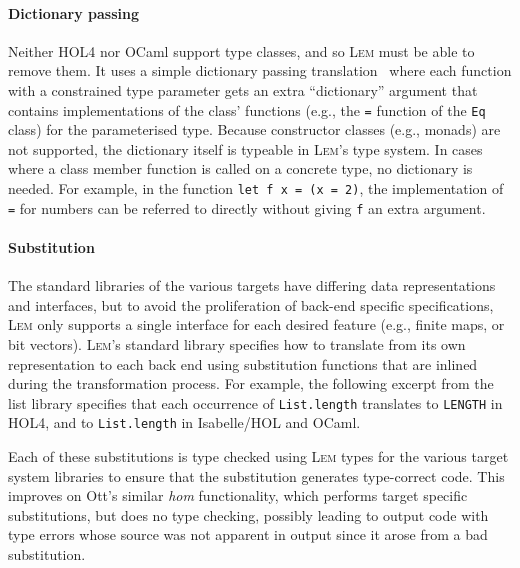 \documentclass[a4paper]{llncs}
\newcommand{\Lem}{\textsc{Lem}}
\begin{document}
\paragraph{Dictionary passing} Neither HOL4 nor OCaml support type classes, and
so \Lem{} must be able to remove them.  It uses a simple dictionary passing
translation~\cite{ocaml-typeclass} where each function with a constrained type
parameter gets an extra ``dictionary'' argument that contains implementations of
the class' functions (e.g., the \texttt{=} function of the \texttt{Eq} class)
for the parameterised type.  Because constructor classes (e.g., monads) are not
supported, the dictionary itself is typeable in \Lem{}'s type system.  In
cases where a class member function is called on a concrete type, no dictionary
is needed.  For example, in the function \texttt{let f x = (x = 2)}, the
implementation of \texttt{=} for numbers can be referred to directly without
giving \texttt{f} an extra argument.

\paragraph{Substitution} The standard libraries of the various targets have
differing data representations and interfaces, but to avoid the proliferation of
back-end specific specifications, \Lem{} only supports a single interface
for each desired feature (e.g., finite maps, or bit vectors).  \Lem{}'s
standard library specifies how to translate from its own representation to each
back end using substitution functions that are inlined during the transformation
process.  For example, the following excerpt from the list library specifies
that each occurrence of \texttt{List.length} translates to \texttt{LENGTH} in
HOL4, and to \texttt{List.length} in Isabelle/HOL and OCaml.

{
\par{}}
\noindent
Each of these substitutions is type checked using \Lem{} types for the various
target system libraries to ensure that the substitution generates type-correct
code.  This improves on Ott's similar \emph{hom} functionality, which performs
target specific substitutions, but does no type checking, possibly leading to
output code with type errors whose source was not apparent in output since it
arose from a bad substitution.
\end{document}
